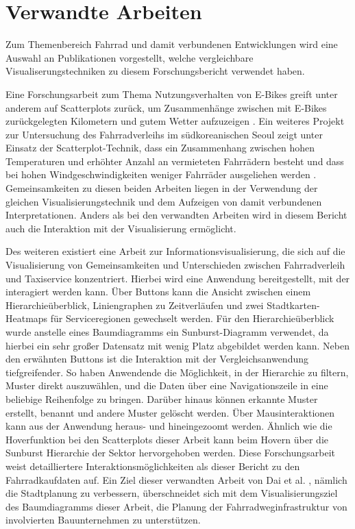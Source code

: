 \documentclass[usegeometry=true]{scrartcl}
\begin{document}
\section{Verwandte Arbeiten}
Zum Themenbereich Fahrrad und damit verbundenen Entwicklungen wird eine Auswahl an Publikationen vorgestellt, welche vergleichbare Visualiserungstechniken zu diesem Forschungsbericht verwendet haben. 

Eine Forschungsarbeit zum Thema Nutzungsverhalten von E-Bikes greift unter anderem auf Scatterplots zurück, um Zusammenhänge zwischen mit E-Bikes zurückgelegten Kilometern und gutem Wetter aufzuzeigen \cite{Rios.06212016}. Ein weiteres Projekt zur Untersuchung des Fahrradverleihs im südkoreanischen Seoul zeigt unter Einsatz der Scatterplot-Technik, dass ein Zusammenhang zwischen hohen Temperaturen und erhöhter Anzahl an vermieteten Fahrrädern besteht und dass bei hohen Windgeschwindigkeiten weniger Fahrräder ausgeliehen werden \cite{Kashyap.2021}. Gemeinsamkeiten zu diesen beiden Arbeiten liegen in der Verwendung der gleichen Visualisierungstechnik und dem Aufzeigen von damit verbundenen Interpretationen. Anders als bei den verwandten Arbeiten wird in diesem Bericht auch die Interaktion mit der Visualisierung ermöglicht. 

Des weiteren existiert eine Arbeit zur Informationsvisualisierung, die sich auf die Visualisierung von Gemeinsamkeiten und Unterschieden zwischen Fahrradverleih und Taxiservice konzentriert. Hierbei wird eine Anwendung bereitgestellt, mit der interagiert werden kann. Über Buttons kann die Ansicht zwischen einem Hierarchieüberblick, Liniengraphen zu Zeitverläufen und zwei Stadtkarten-Heatmaps für Serviceregionen gewechselt werden. Für den Hierarchieüberblick wurde anstelle eines Baumdiagramms ein Sunburst-Diagramm verwendet, da hierbei ein sehr großer Datensatz mit wenig Platz abgebildet werden kann. Neben den erwähnten Buttons ist die Interaktion mit der Vergleichsanwendung tiefgreifender. So haben Anwendende die Möglichkeit, in der Hierarchie zu filtern, Muster direkt auszuwählen, und die Daten über eine Navigationszeile in eine beliebige Reihenfolge zu bringen. Darüber hinaus können erkannte Muster erstellt, benannt und andere Muster gelöscht werden. Über Mausinteraktionen kann aus der Anwendung heraus- und hineingezoomt werden. Ähnlich wie die Hoverfunktion bei den Scatterplots dieser Arbeit kann beim Hovern über die Sunburst Hierarchie der Sektor hervorgehoben werden. Diese Forschungsarbeit weist detailliertere Interaktionsmöglichkeiten als dieser Bericht zu den Fahrradkaufdaten auf. Ein Ziel dieser verwandten Arbeit von Dai et al. \cite{Dai.2020}, nämlich die Stadtplanung zu verbessern, überschneidet sich mit dem Visualisierungsziel des Baumdiagramms dieser Arbeit, die Planung der Fahrradweginfrastruktur von involvierten Bauunternehmen zu unterstützen. 
\end{document}
